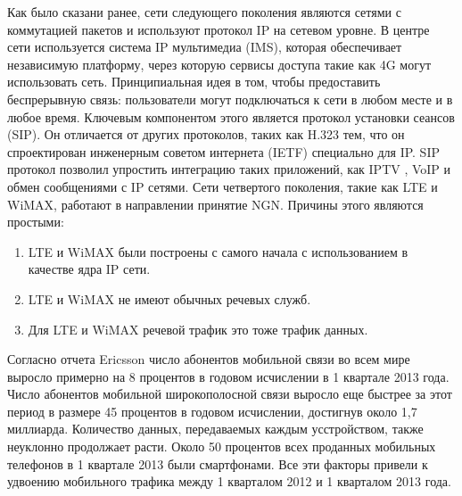 Как было сказани ранее, сети следующего поколения являются сетями с коммутацией пакетов и используют протокол IP на сетевом уровне.
В центре сети используется система IP мультимедиа (IMS), которая обеспечивает независимую платформу, через которую сервисы доступа такие как 4G могут использовать сеть.
Принципиальная идея в том, чтобы предоставить беспрерывную связь: пользователи могут подключаться к сети в любом месте и в любое время.
Ключевым компонентом этого является протокол установки сеансов (SIP).
Он отличается от других протоколов, таких как H.323 тем, что он спроектирован инженерным советом интернета (IETF) специально для IP.
SIP протокол позволил упростить интеграцию таких приложений, как IPTV , VoIP и обмен сообщениями с IP сетями.
Сети четвертого поколения, такие как LTE и WiMAX, работают в направлении принятие NGN. Причины этого являются простыми:
\begin{enumerate}
 \item LTE и WiMAX были построены с самого начала с использованием в качестве ядра IP сети.
 \item LTE и WiMAX не имеют обычных речевых служб.
 \item Для LTE и WiMAX речевой трафик это тоже трафик данных.
\end{enumerate}




Согласно отчета Ericsson \cite{ericsson,ericsson_backgrounder,ericsson_volte} число абонентов мобильной связи во всем мире выросло примерно на 8 процентов в годовом исчислении в 1 квартале 2013 года. Число абонентов мобильной широкополосной связи выросло еще быстрее за этот период в размере 45 процентов в годовом исчислении, достигнув около 1,7 миллиарда. Количество данных, передаваемых каждым усстройством, также неуклонно продолжает расти. Около 50 процентов всех проданных мобильных телефонов в 1 квартале 2013 были смартфонами. Все эти факторы привели к удвоению мобильного трафика между 1 кварталом 2012 и 1 кварталом 2013 года. 

